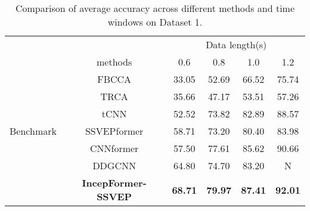 \documentclass[10pt]{iopart}
\begin{document}
\begin{table*}[htbp]
\begin{center}
\caption{Comparison of average accuracy across different methods and time windows on Dataset 1.}
\begin{tabular}{c|c|cccc}
\hline
                      &                            & \multicolumn{4}{c}{Data length(s)}                                \\ \cline{3-6} 
                      & methods                    & 0.6            & 0.8            & 1.0            & 1.2            \\ \hline
                      & FBCCA                      & 33.05          & 52.69          & 66.52          & 75.74          \\
                      & TRCA                       & 35.66          & 47.17          & 53.51          & 57.26          \\
                      & tCNN                       & 52.52          & 73.82          & 82.89          & 88.57          \\
Benchmark             & SSVEPformer                & 58.71          & 73.20          & 80.40          & 83.98          \\
\textbf{}             & CNNformer                  & 57.50          & 77.61          & 85.62          & 90.66          \\
\multicolumn{1}{l|}{} & DDGCNN                     & 64.80          & 74.70          & 83.20          & N              \\
\multicolumn{1}{l|}{} & \textbf{IncepFormer-SSVEP} & \textbf{68.71} & \textbf{79.97} & \textbf{87.41} & \textbf{92.01} \\ \hline
\end{tabular}
\end{center}
\end{table*}
\end{document}
